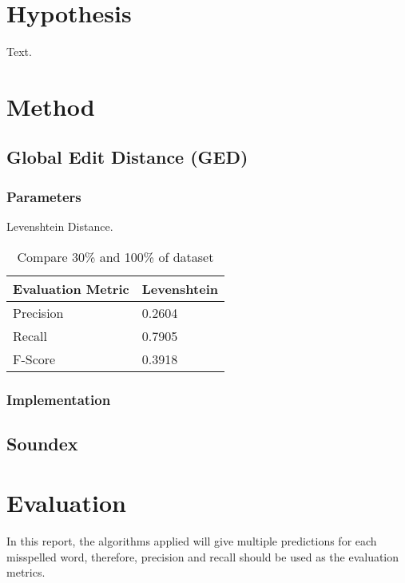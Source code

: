 \documentclass[11pt]{article}
\begin{document}
\section{Hypothesis}

Text.

\section{Method}


\subsection{Global Edit Distance (GED)}

\subsubsection{Parameters}

Levenshtein Distance.

\begin{table}[h]
 \begin{center}
\begin{tabular}{| l | l |}

      \hline
      Evaluation Metric & Levenshtein \\
      \hline\hline
      Precision & 0.2604 \\
      Recall & 0.7905 \\
      F-Score & 0.3918 \\
      \hline

\end{tabular}
\caption{Compare 30\% and 100\% of dataset}\label{table1}
 \end{center}
\end{table}

\subsubsection{Implementation}



 
\subsection{Soundex}

\section{Evaluation}

\paragraph{} In this report, the algorithms applied will give multiple predictions for each misspelled word, therefore, precision and recall should be used as the evaluation metrics.
\end{document}
